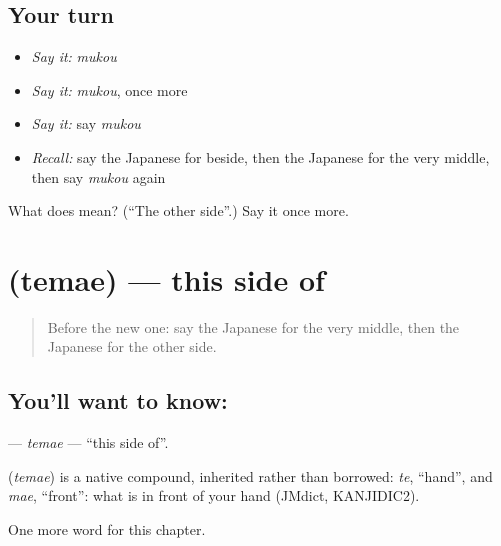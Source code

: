 \subsection*{Your turn}
\begin{itemize}
\raggedright
  \item \emph{Say it:} \emph{mukou}
  \item \emph{Say it:} \emph{mukou}, once more
  \item \emph{Say it:} say \emph{mukou}
  \item \emph{Recall:} say the Japanese for beside, then the Japanese for the very middle, then say \emph{mukou} again
\end{itemize}

\begin{tcolorbox}[breakable,colback=teal!4,colframe=teal!35!black,title={Before you move on}]
What does  mean? (\textquotedblleft{}The other side\textquotedblright{}.) Say it once more.
\end{tcolorbox}
\section[\texorpdfstring{\ja{てまえ} (temae)}{てまえ (temae)}]{ (temae) — this side of}

\label{lesson:JA-C79-temae}



\begin{quote}
Before the new one: say the Japanese for the very middle, then the Japanese for the other side.
\end{quote}

\subsection*{You'll want to know: }
\textbf{} — \emph{temae} — \textquotedblleft{}this side of\textquotedblright{}.

\begin{cousinweb}
\textbf{} (\emph{temae}) is a native compound, inherited rather than borrowed: \emph{te}, \textquotedblleft{}hand\textquotedblright{}, and \emph{mae}, \textquotedblleft{}front\textquotedblright{}: what is in front of your hand (JMdict, KANJIDIC2).
\end{cousinweb}

\begin{grammarlens}[title={What you've built}]
One more word for this chapter.
\end{grammarlens}

